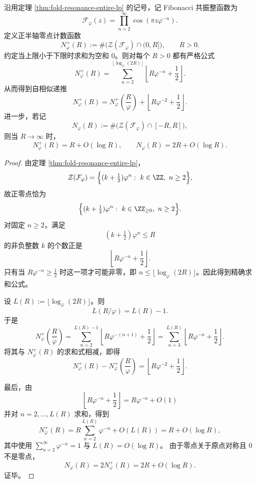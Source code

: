 \begin{theorem}\label{thm:xi-fold-resonance-zero-count-selfsimilar-linear}
沿用定理 \ref{thm:fold-resonance-entire-lp} 的记号，记 Fibonacci 共振整函数为
\[
\mathcal F_\varphi(z)=\prod_{n=2}^{\infty}\cos(\pi z\varphi^{-n}).
\]
定义正半轴零点计数函数
\[
N_\varphi^+(R):=\#\bigl(\mathcal Z(\mathcal F_\varphi)\cap(0,R]\bigr),
\qquad R>0.
\]
约定当上限小于下限时求和为空和 \(0\)。则对每个 \(R>0\) 都有严格公式
\[
\boxed{\;
N_\varphi^+(R)=
\sum_{n=2}^{\lfloor \log_\varphi(2R)\rfloor}
\left\lfloor R\varphi^{-n}+\frac12\right\rfloor.
\;}
\]
从而得到自相似递推
\[
\boxed{\;
N_\varphi^+(R)=N_\varphi^+\!\left(\frac{R}{\varphi}\right)
+\left\lfloor R\varphi^{-2}+\frac12\right\rfloor.
\;}
\]
进一步，若记
\[
N_\varphi(R):=\#\bigl(\mathcal Z(\mathcal F_\varphi)\cap[-R,R]\bigr),
\]
则当 \(R\to\infty\) 时，
\[
\boxed{\;
N_\varphi^+(R)=R+O(\log R),
\qquad
N_\varphi(R)=2R+O(\log R).
\;}
\]
\end{theorem}
\begin{proof}
由定理 \ref{thm:fold-resonance-entire-lp}，
\[
\mathcal Z(\mathcal F_\varphi)=
\Bigl\{(k+\tfrac12)\varphi^n:\ k\in\ZZ,\ n\ge 2\Bigr\},
\]
故正零点恰为
\[
\Bigl\{(k+\tfrac12)\varphi^n:\ k\in\ZZ_{\ge 0},\ n\ge 2\Bigr\}.
\]
对固定 \(n\ge 2\)，满足
\[
(k+\tfrac12)\varphi^n\le R
\]
的非负整数 \(k\) 的个数正是
\[
\left\lfloor R\varphi^{-n}+\frac12\right\rfloor.
\]
只有当 \(R\varphi^{-n}\ge \frac12\) 时这一项才可能非零，即 \(n\le \lfloor\log_\varphi(2R)\rfloor\)。因此得到精确求和公式。

设 \(L(R):=\lfloor\log_\varphi(2R)\rfloor\)。则
\[
L(R/\varphi)=L(R)-1.
\]
于是
\[
N_\varphi^+\!\left(\frac{R}{\varphi}\right)
=
\sum_{n=2}^{L(R)-1}
\left\lfloor R\varphi^{-(n+1)}+\frac12\right\rfloor
=
\sum_{n=3}^{L(R)}
\left\lfloor R\varphi^{-n}+\frac12\right\rfloor.
\]
将其与 \(N_\varphi^+(R)\) 的求和式相减，即得
\[
N_\varphi^+(R)-N_\varphi^+\!\left(\frac{R}{\varphi}\right)
=
\left\lfloor R\varphi^{-2}+\frac12\right\rfloor.
\]

最后，由
\[
\left\lfloor R\varphi^{-n}+\frac12\right\rfloor
=
R\varphi^{-n}+O(1)
\]
并对 \(n=2,\dots,L(R)\) 求和，得到
\[
N_\varphi^+(R)
=
R\sum_{n=2}^{L(R)}\varphi^{-n}+O(L(R))
=
R+O(\log R),
\]
其中使用 \(\sum_{n=2}^{\infty}\varphi^{-n}=1\) 与 \(L(R)=O(\log R)\)。
由于零点关于原点对称且 \(0\) 不是零点，
\[
N_\varphi(R)=2N_\varphi^+(R)=2R+O(\log R).
\]
证毕。
\end{proof}

